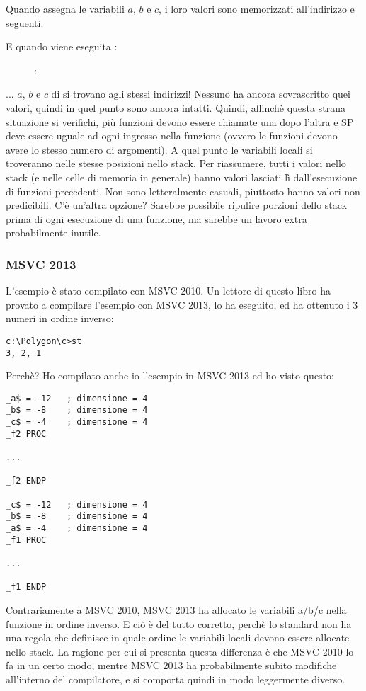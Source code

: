 Quando  assegna le variabili $a$, $b$ e $c$, i loro valori sono memorizzati all'indirizzo  e seguenti.

\clearpage
E quando viene eseguita :

\begin{figure}[H]
\centering
{}
\caption{\olly: }
\label{fig:stack_noise_olly2}
\end{figure}

... $a$, $b$ e $c$ di  si trovano agli stessi indirizzi!
Nessuno ha ancora sovrascritto quei valori, quindi in quel punto sono ancora intatti.
Quindi, affinchè questa strana situazione si verifichi, più funzioni devono essere chiamate una dopo l'altra e
\ac{SP} deve essere uguale ad ogni ingresso nella funzione (ovvero le funzioni devono avere lo stesso numero di argomenti).
A quel punto le variabili locali si troveranno nelle stesse posizioni nello stack.
Per riassumere, tutti i valori nello stack (e nelle celle di memoria in generale) hanno valori lasciati lì dall'esecuzione di funzioni precedenti.
Non sono letteralmente casuali, piuttosto hanno valori non predicibili.
C'è un'altra opzione?
Sarebbe possibile ripulire porzioni dello stack prima di ogni esecuzione di una funzione, ma sarebbe un lavoro extra probabilmente inutile.

\subsubsection{MSVC 2013}

L'esempio è stato compilato con MSVC 2010.
Un lettore di questo libro ha provato a compilare l'esempio con MSVC 2013, lo ha eseguito, ed ha ottenuto i 3 numeri in ordine inverso:%

\begin{lstlisting}
c:\Polygon\c>st
3, 2, 1
\end{lstlisting}

Perchè?
Ho compilato anche io l'esempio in MSVC 2013 ed ho visto questo:


\begin{lstlisting}[caption=MSVC 2013,style=customasmx86]
_a$ = -12	; dimensione = 4
_b$ = -8	; dimensione = 4
_c$ = -4	; dimensione = 4
_f2	PROC

...

_f2	ENDP

_c$ = -12	; dimensione = 4
_b$ = -8	; dimensione = 4
_a$ = -4	; dimensione = 4
_f1	PROC

...

_f1	ENDP
\end{lstlisting}

Contrariamente a MSVC 2010, MSVC 2013 ha allocato le variabili a/b/c nella funzione  in ordine inverso.%
E ciò è del tutto corretto, perchè lo standard \CCpp non ha una regola che definisce in quale ordine le variabili locali devono essere allocate nello stack.
La ragione per cui si presenta questa differenza è che MSVC 2010 lo fa in un certo modo, mentre MSVC 2013 ha probabilmente subito modifiche all'interno del compilatore, e si comporta quindi in modo leggermente diverso.
